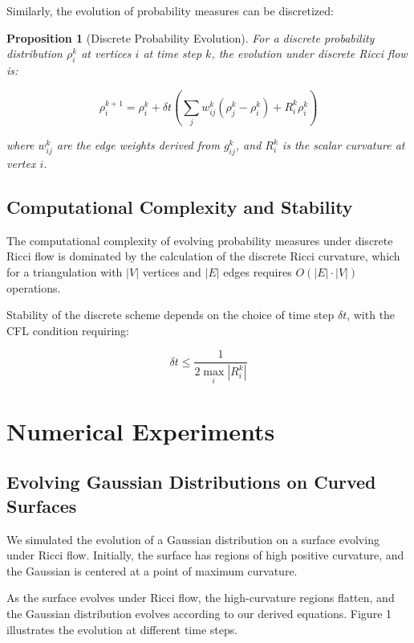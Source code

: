 \documentclass[12pt,a4paper]{article}
\newtheorem{proposition}[theorem]{Proposition}
\begin{document}
Similarly, the evolution of probability measures can be discretized:

\begin{proposition}[Discrete Probability Evolution]
For a discrete probability distribution $\rho_i^k$ at vertices $i$ at time step $k$, the evolution under discrete Ricci flow is:

\begin{equation}
\rho_i^{k+1} = \rho_i^k + \delta t \left(\sum_j w_{ij}^k (\rho_j^k - \rho_i^k) + R_i^k \rho_i^k\right)
\end{equation}

\noindent where $w_{ij}^k$ are the edge weights derived from $g_{ij}^k$, and $R_i^k$ is the scalar curvature at vertex $i$.
\end{proposition}

\subsection{Computational Complexity and Stability}

The computational complexity of evolving probability measures under discrete Ricci flow is dominated by the calculation of the discrete Ricci curvature, which for a triangulation with $|V|$ vertices and $|E|$ edges requires $O(|E| \cdot |V|)$ operations.

Stability of the discrete scheme depends on the choice of time step $\delta t$, with the CFL condition requiring:

\begin{equation}
\delta t \leq \frac{1}{2 \max_i |R_i^k|}
\end{equation}

\section{Numerical Experiments}

\subsection{Evolving Gaussian Distributions on Curved Surfaces}

We simulated the evolution of a Gaussian distribution on a surface evolving under Ricci flow. Initially, the surface has regions of high positive curvature, and the Gaussian is centered at a point of maximum curvature.

As the surface evolves under Ricci flow, the high-curvature regions flatten, and the Gaussian distribution evolves according to our derived equations. Figure 1 illustrates the evolution at different time steps.
\end{document}
